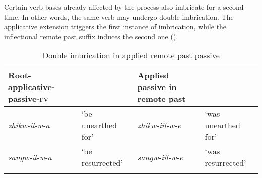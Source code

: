 \documentclass[output=paper]{langsci/langscibook}
\begin{document}
\begin{table}

\caption{Imbrication with vowel lengthening in remote past passive}
\label{tab:26.kawasha}

\end{table}

Certain verb bases already affected by the process also imbricate for a second time. In other words, the same verb may undergo double imbrication. The applicative extension triggers the first instance of imbrication, while the inflectional remote past suffix induces the second one ().

\begin{table} 
\small
\begin{tabularx}{\textwidth}{XlXl}
\lsptoprule
Root-applicative-passive-\textsc{fv} &  & Applied passive in remote past & \\
\midrule
\textit{zhikw-il-w-a} & `be unearthed for' & \textit{zhikw-iil-w-e} & `was unearthed for' \\
\textit{sangw-il-w-a} & `be resurrected' & \textit{sangw-iil-w-e} & `was resurrected' \\

\lspbottomrule
\end{tabularx} 

\caption{Double imbrication in applied remote past passive}
\label{tab:27.kawasha}

\end{table}
\end{document}
